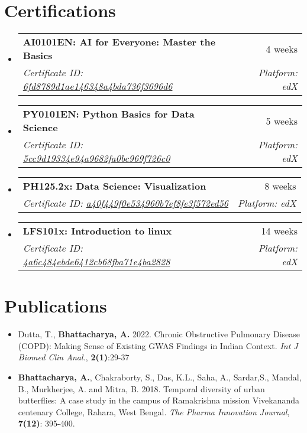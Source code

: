 \documentclass[a4paper,11pt]{article}
\makeatletter
\newcommand{\resumeSubheading}[4]{
  \vspace{-2pt}\item
    \begin{tabular*}{0.97\textwidth}[t]{l@{\extracolsep{\fill}}r}
      \textbf{#1} & #2 \\
      \textit{\small #3} & \textit{\small #4} \\
    \end{tabular*}\vspace{-10pt}
}
\newcommand{\resumeSubHeadingListStart}{\begin{itemize}[leftmargin=0.15in, label={}]}
\newcommand{\resumeSubHeadingListEnd}{\end{itemize}}
\makeatother
\begin{document}
\section{Certifications} 
\resumeSubHeadingListStart
    \resumeSubheading
    {AI0101EN: AI for Everyone: Master the Basics}{4 weeks}
    {Certificate ID: \href{https://courses.edx.org/certificates/6fd8789d1ae146348a4bda736f3696d6}{6fd8789d1ae146348a4bda736f3696d6}}{Platform: edX}
    \resumeSubheading
    {PY0101EN: Python Basics for Data Science}{5 weeks}
    {Certificate ID: \href{https://courses.edx.org/certificates/5cc9d19334e94a9682fa0bc969f726c0}{5cc9d19334e94a9682fa0bc969f726c0}}{Platform: edX}
    \resumeSubheading
    {PH125.2x: Data Science: Visualization}{8 weeks}
    {Certificate ID: \href{https://courses.edx.org/certificates/a40f449f0e534960b7ef8fe3f572ed56}{a40f449f0e534960b7ef8fe3f572ed56}}{Platform: edX}
    \resumeSubheading
    {LFS101x: Introduction to linux}{14 weeks}
    {Certificate ID: \href{https://courses.edx.org/certificates/4a6c484ebde6412cb68fba71e4ba2828}{4a6c484ebde6412cb68fba71e4ba2828}}{Platform: edX}
\resumeSubHeadingListEnd


\section{Publications} 
\begin{itemize}
        \item {Dutta, T., \textbf{Bhattacharya, A.} 2022. Chronic Obstructive Pulmonary Disease (COPD): Making
Sense of Existing GWAS Findings in Indian Context. \textit{Int J Biomed Clin Anal.}, \textbf{2(1)}:29-37}
    \end{itemize}
    \begin{itemize}
        \item {\textbf{Bhattacharya, A.}, Chakraborty, S., Das, K.L., Saha, A., Sardar,S., Mandal, B., Murkherjee, A.
and Mitra, B. 2018. Temporal diversity of urban butterflies: A case study in the campus of
Ramakrishna mission Vivekananda centenary College, Rahara, West Bengal. \textit{The Pharma
Innovation Journal}, \textbf{7(12)}: 395-400.}
    \end{itemize}
    
\end{document}

